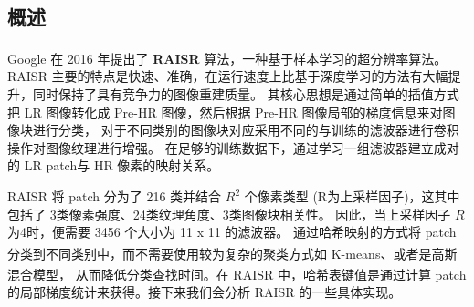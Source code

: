 \documentclass[12pt, a4paper, oneside]{ctexbook}
\begin{document}
	\subsection{概述}
	Google 在 2016 年提出了 \textbf{RAISR}\textsuperscript{\cite{1}} 算法，一种基于样本学习的超分辨率算法。 
	RAISR 主要的特点是快速、准确，在运行速度上比基于深度学习的方法有大幅提升，同时保持了具有竞争力的图像重建质量。
	其核心思想是通过简单的插值方式把 LR 图像转化成 Pre-HR 图像，然后根据 Pre-HR 图像局部的梯度信息来对图像块进行分类，
	对于不同类别的图像块对应采用不同的与训练的滤波器进行卷积操作对图像纹理进行增强。
	在足够的训练数据下，通过学习一组滤波器建立成对的 LR patch与 HR 像素的映射关系。
	\par RAISR 将 patch 分为了 216 类并结合 $R^2$ 个像素类型 (R为上采样因子)，这其中包括了 3类像素强度、24类纹理角度、3类图像块相关性。
	因此，当上采样因子 $R$ 为4时，便需要 3456 个大小为 11 x 11 的滤波器。
	通过哈希映射的方式将 patch 分类到不同类别中，而不需要使用较为复杂的聚类方式如 K-means\textsuperscript{\cite{2}}、或者是高斯混合模型\textsuperscript{\cite{3}}，
	从而降低分类查找时间。在 RAISR 中，哈希表键值是通过计算 patch 的局部梯度统计来获得。接下来我们会分析 RAISR 的一些具体实现。
\end{document}
